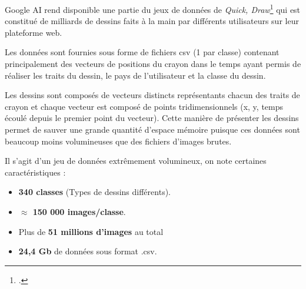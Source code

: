 Google AI rend disponible une partie du jeux de données de \emph{Quick, Draw}\footcite{Qd:Data} qui est constitué de milliards de dessins faits à la main par différents utilisateurs sur leur plateforme web. 


Les données sont fournies sous forme de fichiers csv (1 par classe) contenant principalement des vecteurs de positions du crayon dans le temps ayant permis de réaliser les traits du dessin, le pays de l'utilisateur et la classe du dessin.

Les dessins sont composés de vecteurs distincts représentants chacun des traits de crayon et chaque vecteur est composé de points tridimensionnels (x, y, temps écoulé depuis le premier point du vecteur).
Cette manière de présenter les dessins permet de sauver une grande quantité d'espace mémoire puisque ces données sont beaucoup moins volumineuses que des fichiers d'images brutes.

Il s'agit d'un jeu de données extrêmement volumineux, on note certaines caractéristiques :

\begin{itemize}
	\item \textbf{340 classes} (Types de dessins différents).
	\item \textbf{$\approx$ 150 000 images/classe}.
	\item Plus de \textbf{51 millions d'images} au total
	\item \textbf{24,4 Gb} de données sous format .csv.
\end{itemize}
